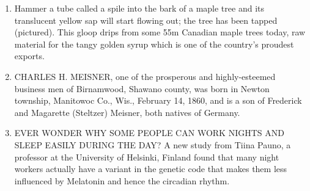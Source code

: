 \begin{enumerate}
  \item Hammer a tube called a spile into the bark of a maple tree and its translucent yellow sap will start flowing out; the tree has been tapped (pictured). This gloop drips from some 55m Canadian maple trees today, raw material for the tangy golden syrup which is one of the country's proudest exports.
  \item CHARLES H. MEISNER, one of the prosperous and highly-esteemed business men of Birnamwood, Shawano county, was born in Newton township, Manitowoc Co., Wis., February 14, 1860, and is a son of Frederick and Magarette (Steltzer) Meisner, both natives of Germany.
  \item EVER WONDER WHY SOME PEOPLE CAN WORK NIGHTS AND SLEEP EASILY DURING THE DAY? A new study from Tiina Pauno, a professor at the University of Helsinki, Finland found that many night workers actually have a variant in the genetic code that makes them less influenced by Melatonin and hence the circadian rhythm.
\end{enumerate}

